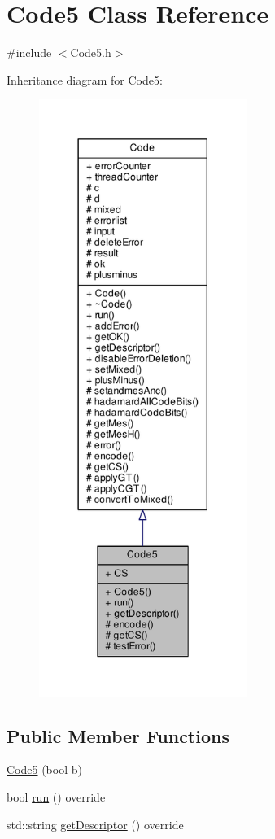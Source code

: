 \hypertarget{class_code5}{}\section{Code5 Class Reference}
\label{class_code5}


{\ttfamily \#include $<$Code5.\+h$>$}



Inheritance diagram for Code5\+:
\nopagebreak
\begin{figure}[H]
\begin{center}
\leavevmode
\includegraphics[height=550pt]{class_code5__inherit__graph}
\end{center}
\end{figure}
\subsection*{Public Member Functions}
\begin{DoxyCompactItemize}
\item 
\hyperlink{class_code5_ae98c6fa8281984fdc2f78e7d989a8664}{Code5} (bool b)
\item 
bool \hyperlink{class_code5_ad2aec9994037880f38205e739a8f8a4a}{run} () override
\item 
std\+::string \hyperlink{class_code5_ab7cd6f3c172a4a0c45bc0fa41a3ff535}{get\+Descriptor} () override
\end{DoxyCompactItemize}
